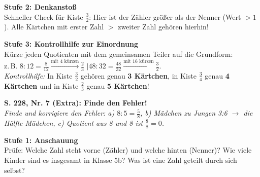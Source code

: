 \documentclass[a4paper,10pt]{article}
\begin{document}
\begin{tcolorbox}[colback=step2Bg, colframe=step2Border, arc=1.8mm, boxrule=0.7pt, left=3mm, right=3mm, top=1.8mm, bottom=1.8mm]
    {\color{step2Text}\small\bfseries\faLightbulb\enskip Stufe 2: Denkanstoß}\\[1mm]
    {\footnotesize Schneller Check für Kiste $\frac{3}{2}$: Hier ist der Zähler größer als der Nenner (Wert $>1$). Alle Kärtchen mit erster Zahl $>$ zweiter Zahl gehören hierhin!}
\end{tcolorbox}

\begin{tcolorbox}[colback=step3Bg, colframe=step3Border, arc=1.8mm, boxrule=0.7pt, left=3mm, right=3mm, top=1.8mm, bottom=1.8mm]
    {\color{step3Text}\small\bfseries\faCheckSquare\enskip Stufe 3: Kontrollhilfe zur Einordnung}\\[1mm]
    {\footnotesize
    Kürze jeden Quotienten mit dem gemeinsamen Teiler auf die Grundform:\\
    z.\,B. $8:12 = \frac{8}{12} \xrightarrow{\text{mit 4 kürzen}} \frac{2}{3}$ \quad$|$\quad $48:32 = \frac{48}{32} \xrightarrow{\text{mit 16 kürzen}} \frac{3}{2}$.\\[1mm]
    \textit{Kontrollhilfe:} In Kiste $\frac{3}{2}$ gehören genau \textbf{3 Kärtchen}, in Kiste $\frac{3}{4}$ genau \textbf{4 Kärtchen} und in Kiste $\frac{2}{3}$ genau \textbf{5 Kärtchen}!}
\end{tcolorbox}

\vspace{3.5mm}

\begin{tcolorbox}[enhanced, colback=lvlPurple!5, colframe=lvlPurple!50, arc=2mm, boxrule=0.8pt, left=3mm, right=3mm, top=2mm, bottom=2mm]
    {\bfseries\color{lvlPurple} \faStar\faStar\faStar\enskip S. 228, Nr. 7 (Extra): Finde den Fehler!}\\[1mm]
    {\footnotesize\textit{Finde und korrigiere den Fehler: a) $8 : 5 = \frac{5}{8}$, b) Mädchen zu Jungen 3:6 $\to$ die Hälfte Mädchen, c) Quotient aus 8 und 8 ist $\frac{8}{8} = 0$.}}
\end{tcolorbox}

\vspace{1.5mm}

\begin{tcolorbox}[colback=step1Bg, colframe=step1Border, arc=1.8mm, boxrule=0.7pt, left=3mm, right=3mm, top=1.8mm, bottom=1.8mm]
    {\color{step1Text}\small\bfseries\faEye\enskip Stufe 1: Anschauung}\\[1mm]
    {\footnotesize Prüfe: Welche Zahl steht vorne (Zähler) und welche hinten (Nenner)? Wie viele Kinder sind es insgesamt in Klasse 5b? Was ist eine Zahl geteilt durch sich selbst?}
\end{tcolorbox}
\end{document}
